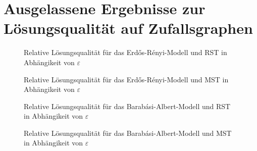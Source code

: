 \documentclass[headsepline,footsepline,footinclude=false,fontsize=11pt,paper=a4,listof=totoc,bibliography=totoc,BCOR=12mm,DIV=12]{scrbook} %
\newcommand{\eps}{\varepsilon}
\begin{document}


\frontmatter{}



%


\tableofcontents{}

\mainmatter{}

\selectfont







\appendix{}
\chapter{Ausgelassene Ergebnisse zur Lösungsqualität auf Zufallsgraphen}\label{chapter:rapp}

\begin{figure}
    \centering
    
    \caption{Relative Lösungsqualität für das Erdős-Rényi-Modell und RST in Abhängikeit von $\eps$}
\end{figure}

\begin{figure}
    \centering
    
    \caption{Relative Lösungsqualität für das Erdős-Rényi-Modell und MST in Abhängikeit von $\eps$}
\end{figure}

\begin{figure}
    \centering
    
    \caption{Relative Lösungsqualität für das Barabási-Albert-Modell und RST in Abhängikeit von $\eps$}
\end{figure}

\begin{figure}
    \centering
    
    \caption{Relative Lösungsqualität für das Barabási-Albert-Modell und MST in Abhängikeit von $\eps$}
\end{figure}

\listoffigures{}
\listoftables{}
\listofalgorithms{}
\lstlistoflistings{}
\printbibliography{}
\end{document}
